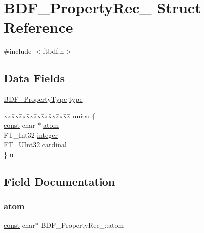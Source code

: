 \hypertarget{struct_b_d_f___property_rec__}{}\section{B\+D\+F\+\_\+\+Property\+Rec\+\_\+ Struct Reference}
\label{struct_b_d_f___property_rec__}


{\ttfamily \#include $<$ftbdf.\+h$>$}

\subsection*{Data Fields}
\begin{DoxyCompactItemize}
\item 
\hyperlink{ftbdf_8h_a3e95a243aac87978075ca8b42635a0b2}{B\+D\+F\+\_\+\+Property\+Type} \hyperlink{struct_b_d_f___property_rec___a88c19ee6f16bd1b36127f5f7d44a4e39}{type}
\item 
\begin{tabbing}
xx\=xx\=xx\=xx\=xx\=xx\=xx\=xx\=xx\=\kill
union \{\\
\>\hyperlink{zconf_8h_a2c212835823e3c54a8ab6d95c652660e}{const} char $\ast$ \hyperlink{struct_b_d_f___property_rec___aa8d56dc848d8a2c8e2f7e40a63f5d032}{atom}\\
\>FT\_Int32 \hyperlink{struct_b_d_f___property_rec___a71243b414ad203fd7d6d2468c39bbd79}{integer}\\
\>FT\_UInt32 \hyperlink{struct_b_d_f___property_rec___adaba2e4ce8da90a5ea59080a0521d332}{cardinal}\\
\} \hyperlink{struct_b_d_f___property_rec___a6f9a624f1c1f5890825b0330b42586b9}{u}\\

\end{tabbing}\end{DoxyCompactItemize}


\subsection{Field Documentation}
\mbox{\label{struct_b_d_f___property_rec___aa8d56dc848d8a2c8e2f7e40a63f5d032}} 
\subsubsection{\texorpdfstring{atom}{atom}}
{\footnotesize\ttfamily \hyperlink{zconf_8h_a2c212835823e3c54a8ab6d95c652660e}{const} char$\ast$ B\+D\+F\+\_\+\+Property\+Rec\+\_\+\+::atom}

